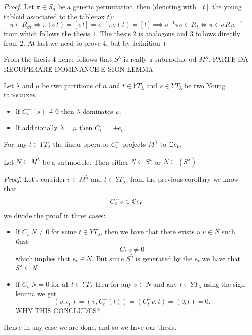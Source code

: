 \documentclass[11pt]{scrartcl}
\begin{document}
	\begin{proof}
		Let $\pi\in S_n$ be a generic permutation, then (denoting with $[t]$ the young tabloid associated to the tableuax $t$):
		$$\pi\in R_{\sigma t} \iff \pi(\sigma t)=[\sigma t]=\sigma^{-1}\pi\sigma(t)=[t] \implies \sigma^{-1} \pi \sigma \in R_t \iff \pi\in \sigma R_t\sigma^{-1}$$
		from which follows the thesis $1$. The thesis $2$ is analogous and $3$ follows directly from $2$. At last we need to prove $4$, but by definition
	\end{proof}
	From the thesis $4$ hence follows that $S^\lambda$ is really a submodule od $M^\lambda$.
	PARTE DA RECUPERARE DOMINANCE E SIGN LEMMA
	\begin{corollary}
		Let $\lambda$ and $\mu$ be two partitions of $n$ and $t\in YT_\lambda$ and $s\in YT_\lambda$ be two Young tableauxes.
		\begin{itemize}
			\item If $C^-_t(s)\ne 0$ then $\lambda$ dominates $\mu$. 
			\item If additionally $\lambda=\mu$ then $C_t^{-}=\pm e_t$.
		\end{itemize}
	\end{corollary}
	\begin{corollary}
		For any $t\in YT_\lambda$ the linear operator $C_t^-$ projects $M^\lambda$ to $\mathbb C e_t$.
	\end{corollary}
	\begin{theorem}
		Let $N\subseteq M^\lambda$ be a submodule. Then either
		$N\subseteq S^\lambda$ or $N\subseteq \left(S^\lambda\right)^\perp$. 
	\end{theorem}
	\begin{proof}
		Let's consider $v\in M^\lambda$ and $t\in YT_\lambda$, from the previous corollary we know that
		$$C_t^-v\in \mathbb C e_t$$
		we divide the proof in three cases:
		\begin{itemize}
			\item If $C_t^- N \ne 0$ for some $t\in YT_\lambda$, then we have that there exists a $v\in N$ such that 
			$$C_t^-v\ne 0$$
			which implies that $e_t\in N$. But since $S^\lambda$ is generated by the $e_t$ we have that $S^\lambda\subseteq N$.
			\item If $C_t^-N=0$ for all $t\in YT_\lambda$ then for any $v\in N$ and any $t\in YT_\lambda$ using the sign lemma we get
			$$(v,e_t)=(v,C_t^-(t))=(C_t^-v,t)=(0,t)=0.$$
			WHY THIS CONCLUDES?
		\end{itemize}
		Hence in any case we are done, and so we have our thesis.
	\end{proof}
\end{document}
